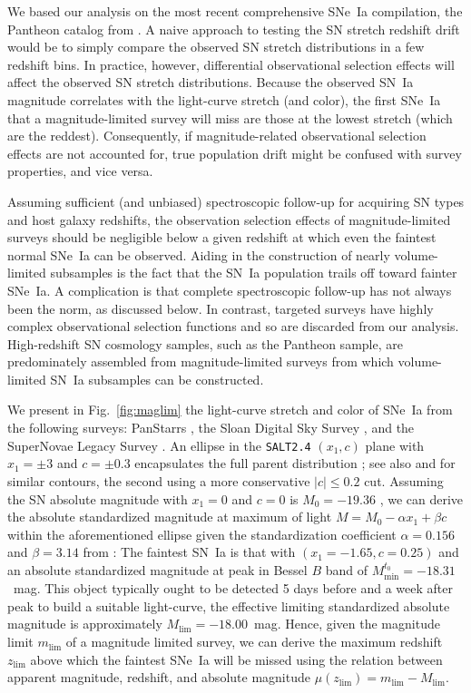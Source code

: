 \documentclass[]{aa}
\begin{document}
We based our analysis on the most recent comprehensive SNe~Ia compilation, the
Pantheon catalog from \cite{scolnic2018a}. A naive approach to testing the SN
stretch redshift drift would be to simply compare the observed SN stretch
distributions in a few redshift bins. In practice, however, differential
observational selection effects will affect the observed SN stretch
distributions. Because the observed SN~Ia magnitude correlates with the
light-curve stretch (and color), the first SNe~Ia that a magnitude-limited
survey will miss are those at the lowest stretch (which are the reddest).
Consequently, if magnitude-related observational selection effects are not
accounted for, true population drift might be confused with survey properties,
and vice versa.

Assuming sufficient (and unbiased) spectroscopic follow-up for acquiring SN
types and host galaxy redshifts, the observation selection effects of
magnitude-limited surveys should be negligible below a given redshift at which
even the faintest normal SNe~Ia can be observed. Aiding in the construction of
nearly volume-limited subsamples is the fact that the SN~Ia population trails
off toward fainter SNe~Ia. A complication is that complete spectroscopic
follow-up has not always been the norm, as discussed below. In contrast,
targeted surveys have highly complex observational selection functions and so
are discarded from our analysis. High-redshift SN cosmology samples, such as the
Pantheon sample, are predominately assembled from magnitude-limited surveys from
which volume-limited SN~Ia subsamples can be constructed.

We present in Fig.~\ref{fig:maglim} the light-curve stretch and color of SNe~Ia
from the following surveys: PanStarrs \citep[PS1][]{rest2014}, the Sloan Digital
Sky Survey \citep[SDSS][]{frieman2008}, and the SuperNovae Legacy Survey
\citep[SNLS][]{astier2006}. An ellipse in the \textsc{\texttt{SALT2.4}} $(x_1,
c)$ plane with $x_1 = \pm 3$ and $c = \pm 0.3$ encapsulates the full parent
distribution \citep{guy2007, betoule2014}; see also \citet{bazin2011} and
\citet{campbell2013} for similar contours, the second using a more conservative
$|c| \leq 0.2$ cut. Assuming the SN absolute magnitude with $x_1=0$ and $c=0$ is
$M_0=-19.36$ \citep{kessler2009,scolnic2014}, we can derive the absolute
standardized magnitude at maximum of light $M = M_0 - \alpha x_1 + \beta c$
within the aforementioned ellipse given the standardization coefficient
$\alpha=0.156$ and $\beta=3.14$ from \cite{scolnic2018a}: The faintest SN~Ia is
that with $(x_1=-1.65, c=0.25)$ and an absolute standardized magnitude at peak
in Bessel $B$ band of $M^{t_0}_{\min} = -18.31$~mag. This object typically ought
to be detected 5 days before and a week after peak to build a suitable
light-curve, the effective limiting standardized absolute magnitude is
approximately $M_{\lim} = -18.00$~mag. Hence, given the magnitude limit
$m_{\lim}$ of a magnitude limited survey, we can derive the maximum redshift
$z_{\lim}$ above which the faintest SNe~Ia will be missed using the relation
between apparent magnitude, redshift, and absolute magnitude $\mu(z_{\lim}) =
m_{\lim} - M_{\lim}$.
\end{document}
